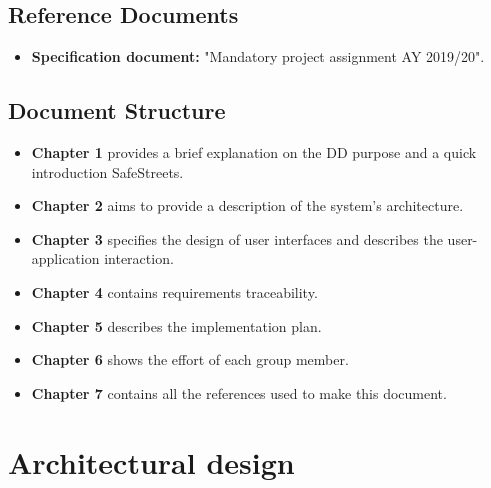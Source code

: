 \documentclass[12pt,a4paper]{report}
\begin{document}
		\section{Reference Documents}
			\begin{itemize}
				\item \textbf{Specification document:} "Mandatory project assignment AY 2019/20".
			\end{itemize}
		\section{Document Structure}
			\begin{itemize}
				\item \textbf{Chapter 1} provides a brief explanation on the DD purpose and a quick introduction
					SafeStreets.
				\item \textbf{Chapter 2} aims to provide a description of the system's architecture.
				\item \textbf{Chapter 3} specifies the design of user interfaces and describes the user-application
					interaction.
				\item \textbf{Chapter 4} contains requirements traceability.
				\item \textbf{Chapter 5} describes the implementation plan.
				\item \textbf{Chapter 6} shows the effort of each group member.
				\item \textbf{Chapter 7} contains all the references used to make this document.
			\end{itemize}

	\chapter{Architectural design}
\end{document}
